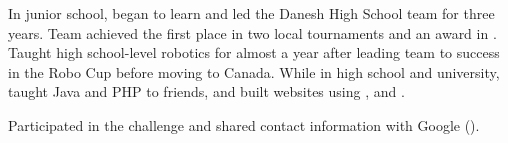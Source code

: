 

\begin{cvparagraph}

In junior school, began to learn  and led the Danesh High School team for three years. Team achieved the first place in two local tournaments and an award in . Taught high school-level robotics for almost a year after leading team to success in the Robo Cup before moving to Canada. While in high school and university, taught Java and PHP to friends, and built websites using ,  and .

Participated in the  challenge and shared contact information with Google ().
\end{cvparagraph}